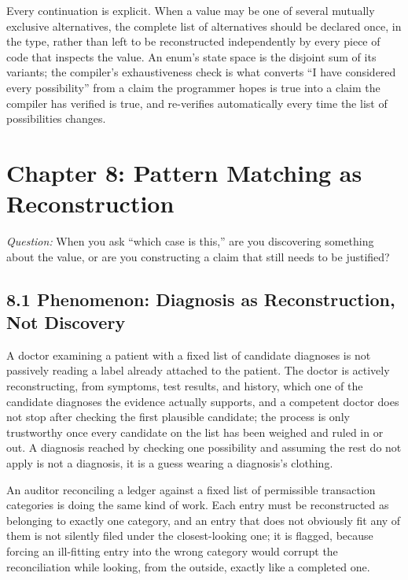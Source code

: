 \documentclass[11pt]{book}
\begin{document}
\begin{invariantbox}
Every continuation is explicit. When a value may be one of several mutually exclusive alternatives, the complete list of alternatives should be declared once, in the type, rather than left to be reconstructed independently by every piece of code that inspects the value. An enum's state space is the disjoint sum of its variants; the compiler's exhaustiveness check is what converts ``I have considered every possibility'' from a claim the programmer hopes is true into a claim the compiler has verified is true, and re-verifies automatically every time the list of possibilities changes.
\end{invariantbox}

\clearpage

\chapter*{Chapter 8: Pattern Matching as Reconstruction}

\begin{firstprinciples}
\textit{Question:} When you ask ``which case is this,'' are you discovering something about the value, or are you constructing a claim that still needs to be justified?
\end{firstprinciples}

\section*{8.1 Phenomenon: Diagnosis as Reconstruction, Not Discovery}

A doctor examining a patient with a fixed list of candidate diagnoses is not passively reading a label already attached to the patient. The doctor is actively reconstructing, from symptoms, test results, and history, which one of the candidate diagnoses the evidence actually supports, and a competent doctor does not stop after checking the first plausible candidate; the process is only trustworthy once every candidate on the list has been weighed and ruled in or out. A diagnosis reached by checking one possibility and assuming the rest do not apply is not a diagnosis, it is a guess wearing a diagnosis's clothing.

An auditor reconciling a ledger against a fixed list of permissible transaction categories is doing the same kind of work. Each entry must be reconstructed as belonging to exactly one category, and an entry that does not obviously fit any of them is not silently filed under the closest-looking one; it is flagged, because forcing an ill-fitting entry into the wrong category would corrupt the reconciliation while looking, from the outside, exactly like a completed one.
\end{document}
